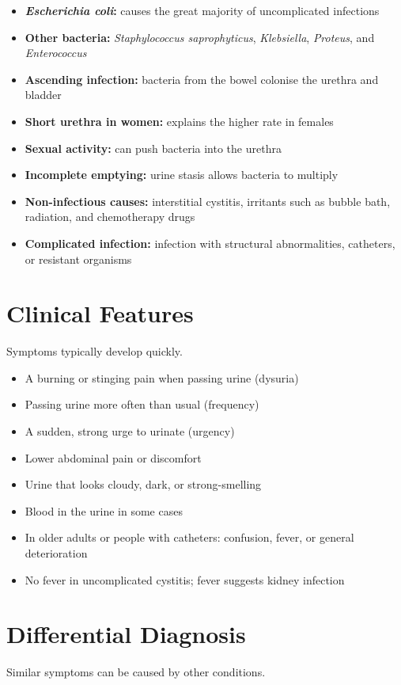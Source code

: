 \begin{itemize}
    \item \textbf{\textit{Escherichia coli}:} causes the great majority of uncomplicated infections
    \item \textbf{Other bacteria:} \textit{Staphylococcus saprophyticus}, \textit{Klebsiella}, \textit{Proteus}, and \textit{Enterococcus}
    \item \textbf{Ascending infection:} bacteria from the bowel colonise the urethra and bladder
    \item \textbf{Short urethra in women:} explains the higher rate in females
    \item \textbf{Sexual activity:} can push bacteria into the urethra
    \item \textbf{Incomplete emptying:} urine stasis allows bacteria to multiply
    \item \textbf{Non-infectious causes:} interstitial cystitis, irritants such as bubble bath, radiation, and chemotherapy drugs
    \item \textbf{Complicated infection:} infection with structural abnormalities, catheters, or resistant organisms
\end{itemize}

\section*{Clinical Features}
Symptoms typically develop quickly.

\begin{itemize}
    \item A burning or stinging pain when passing urine (dysuria)
    \item Passing urine more often than usual (frequency)
    \item A sudden, strong urge to urinate (urgency)
    \item Lower abdominal pain or discomfort
    \item Urine that looks cloudy, dark, or strong-smelling
    \item Blood in the urine in some cases
    \item In older adults or people with catheters: confusion, fever, or general deterioration
    \item No fever in uncomplicated cystitis; fever suggests kidney infection
\end{itemize}

\section*{Differential Diagnosis}
Similar symptoms can be caused by other conditions.

